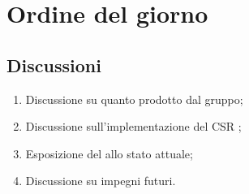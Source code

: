 \section{Ordine del giorno} \label{sec:agenda}
\subsection{Discussioni} \label{subsec:discussione}
\begin{enumerate}
    \item Discussione su quanto prodotto dal gruppo;
    \item Discussione sull'implementazione del CSR ;
    \item Esposizione del  allo stato attuale;
    \item Discussione su impegni futuri.
\end{enumerate}

